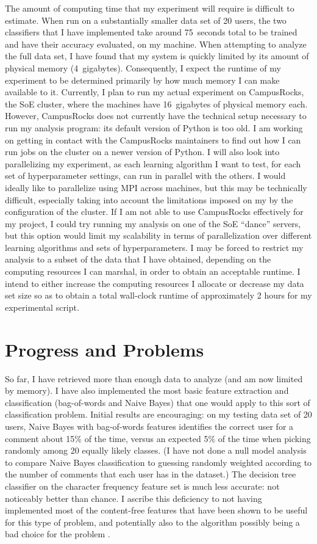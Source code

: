 \documentclass{article}
\begin{document}
The amount of computing time that my experiment will require is difficult to estimate. When run on a substantially smaller data set of 20 users, the two classifiers that I have implemented take around 75~seconds total to be trained and have their accuracy evaluated, on my machine. When attempting to analyze the full data set, I have found that my system is quickly limited by its amount of physical memory (4~gigabytes). Consequently, I expect the runtime of my experiment to be determined primarily by how much memory I can make available to it. Currently, I plan to run my actual experiment on CampusRocks, the SoE cluster, where the machines have 16~gigabytes of physical memory each. However, CampusRocks does not currently have the technical setup necessary to run my analysis program: its default version of Python is too old. I am working on getting in contact with the CampusRocks maintainers to find out how I can run jobs on the cluster on a newer version of Python. I will also look into parallelizing my experiment, as each learning algorithm I want to test, for each set of hyperparameter settings, can run in parallel with the others. I would ideally like to parallelize using MPI across machines, but this may be technically difficult, especially taking into account the limitations imposed on my by the configuration of the cluster. If I am not able to use CampusRocks effectively for my project, I could try running my analysis on one of the SoE ``dance'' servers, but this option would limit my scalability in terms of parallelization over different learning algorithms and sets of hyperparameters. I may be forced to restrict my analysis to a subset of the data that I have obtained, depending on the computing resources I can marshal, in order to obtain an acceptable runtime. I intend to either increase the computing resources I allocate or decrease my data set size so as to obtain a total wall-clock runtime of approximately 2 hours for my experimental script.


\section{Progress and Problems}

So far, I have retrieved more than enough data to analyze (and am now limited by memory). I have also implemented the most basic feature extraction and classification (bag-of-words and Naive Bayes) that one would apply to this sort of classification problem. Initial results are encouraging: on my testing data set of 20 users, Naive Bayes with bag-of-words features identifies the correct user for a comment about 15\% of the time, versus an expected 5\% of the time when picking randomly among 20 equally likely classes. (I have not done a null model analysis to compare Naive Bayes classification to guessing randomly weighted according to the number of comments that each user has in the dataset.) The decision tree classifier on the character frequency feature set is much less accurate: not noticeably better than chance. I ascribe this deficiency to not having implemented most of the content-free features that have been shown to be useful for this type of problem, and potentially also to the algorithm possibly being a bad choice for the problem \cite{narayanan2012feasibility}.
\end{document}
